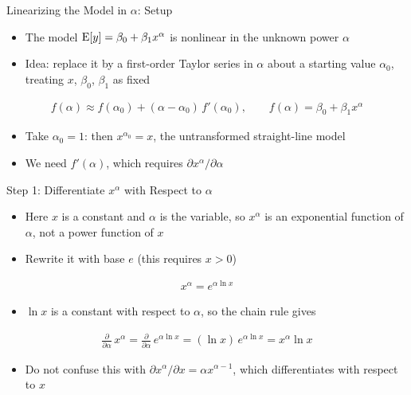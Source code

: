 \begin{frame}{Linearizing the Model in $\alpha$: Setup}
\begin{itemize}
    \item The model $\operatorname{E}[y] = \beta_0 + \beta_1 x^\alpha$ is nonlinear in the unknown power $\alpha$
    \item Idea: replace it by a first-order Taylor series in $\alpha$ about a starting value $\alpha_0$, treating $x$, $\beta_0$, $\beta_1$ as fixed
\end{itemize}
\begin{align*}
    f(\alpha) \approx f(\alpha_0) + (\alpha - \alpha_0)\, f'(\alpha_0), \qquad f(\alpha) = \beta_0 + \beta_1 x^\alpha
\end{align*}
\begin{itemize}
    \item Take $\alpha_0 = 1$: then $x^{\alpha_0} = x$, the untransformed straight-line model
    \item We need $f'(\alpha)$, which requires $\partial x^\alpha / \partial \alpha$
\end{itemize}
\end{frame}


\begin{frame}{Step 1: Differentiate $x^\alpha$ with Respect to $\alpha$}
\begin{itemize}
    \item Here $x$ is a constant and $\alpha$ is the variable, so $x^\alpha$ is an exponential function of $\alpha$, not a power function of $x$
    \item Rewrite it with base $e$ (this requires $x > 0$)
\end{itemize}
\begin{align*}
    x^\alpha = e^{\alpha \ln x}
\end{align*}
\begin{itemize}
    \item $\ln x$ is a constant with respect to $\alpha$, so the chain rule gives
\end{itemize}
\begin{align*}
    \frac{\partial}{\partial \alpha}\, x^\alpha = \frac{\partial}{\partial \alpha}\, e^{\alpha \ln x} = (\ln x)\, e^{\alpha \ln x} = x^\alpha \ln x
\end{align*}
\begin{itemize}
    \item Do not confuse this with $\partial x^\alpha / \partial x = \alpha x^{\alpha - 1}$, which differentiates with respect to $x$
\end{itemize}
\end{frame}


